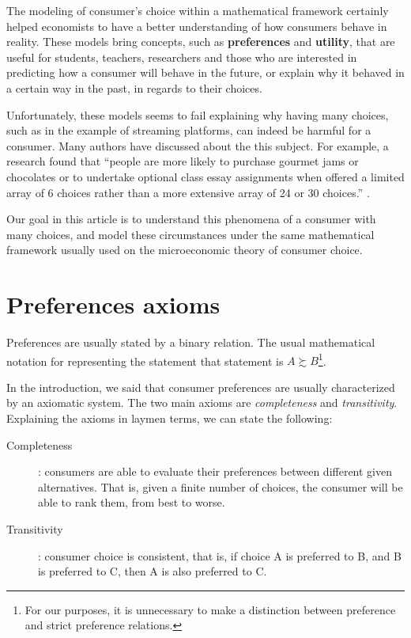 \documentclass[12pt, letterpaper]{article}
\begin{document}
	The modeling of consumer's choice within a mathematical framework certainly helped economists to have a better understanding of how consumers behave in reality. These models bring concepts, such as \textbf{preferences} and \textbf{utility}, that are useful for students, teachers, researchers and those who are interested in predicting how a consumer will behave in the future, or explain why it behaved in a certain way in the past, in regards to their choices.

	Unfortunately, these models seems to fail explaining why having many choices, such as in the example of streaming platforms, can indeed be harmful for a consumer. Many authors have discussed about the this subject. For example, a research found that ``people are more likely to purchase gourmet jams or chocolates or to
	undertake optional class essay assignments when offered a limited array of 6 choices rather than a more extensive array of 24 or 30 choices.'' \cite{IYENGAR_LEPPER_2000}.

	Our goal in this article is to understand this phenomena of a consumer with many choices, and model these circumstances under the same mathematical framework usually used on the microeconomic theory of consumer choice.

	\section{Preferences axioms}
	Preferences are usually stated by a binary relation. The usual mathematical notation for representing the statement that  statement is $A \succsim B$\footnote{For our purposes, it is unnecessary to make a distinction between preference and strict preference relations.}.

	In the introduction, we said that consumer preferences are usually characterized by an axiomatic system. The two main axioms are \textit{completeness} and \textit{transitivity}. Explaining the axioms in laymen terms, we can state the following:

	\begin{description}
		\item[Completeness]: consumers are able to evaluate their preferences between different given alternatives. That is, given a finite number of choices, the consumer will be able to rank them, from best to worse.
		\item[Transitivity]: consumer choice is consistent, that is, if choice A is preferred to B, and B is preferred to C, then A is also preferred to C.
	\end{description}
\end{document}
